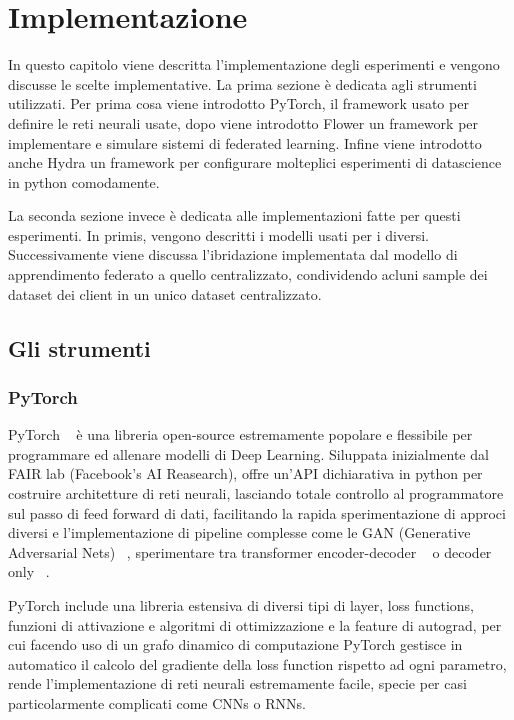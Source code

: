 \chapter{Implementazione}
In questo capitolo viene descritta l'implementazione degli esperimenti
e vengono discusse le scelte implementative.
La prima sezione è dedicata agli strumenti utilizzati. Per prima cosa
viene introdotto PyTorch, il framework usato per 
definire le reti neurali usate, dopo viene introdotto Flower un 
framework per implementare e simulare sistemi di federated learning.
Infine viene introdotto anche Hydra un framework per configurare 
molteplici esperimenti di datascience in python comodamente.

La seconda sezione invece è dedicata alle implementazioni fatte per 
questi esperimenti. In primis, vengono descritti i modelli usati per
i diversi. Successivamente viene discussa l'ibridazione implementata 
dal modello di 
apprendimento federato a quello centralizzato, condividendo acluni 
sample dei dataset dei client in un unico dataset centralizzato.


\section{Gli strumenti}
\subsection{PyTorch}
PyTorch ~\cite{pytorch} è una libreria open-source estremamente popolare e flessibile 
per programmare ed allenare modelli di Deep Learning.
Siluppata inizialmente dal FAIR lab (Facebook's AI Reasearch), offre
un'API dichiarativa in python per costruire architetture di reti 
neurali, lasciando totale controllo al programmatore sul passo di 
feed forward di dati, facilitando la rapida sperimentazione di 
approci diversi e l'implementazione di pipeline
complesse come le GAN (Generative Adversarial Nets) ~\cite{goodfellow2014gan},
sperimentare tra transformer encoder-decoder ~\cite{vaswani2017trans}
o decoder only ~\cite{Radford2018ImprovingLU}.

PyTorch include una libreria estensiva di diversi tipi di layer,
loss functions, funzioni di attivazione e algoritmi di ottimizzazione
e la feature di autograd,
per cui facendo uso di un grafo dinamico di computazione PyTorch 
gestisce in automatico il calcolo del gradiente della loss function 
rispetto ad ogni parametro, rende l'implementazione di reti neurali 
estremamente facile, specie per casi particolarmente complicati 
come CNNs o RNNs.

